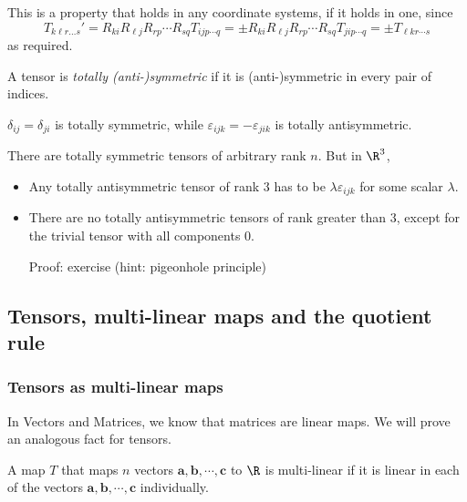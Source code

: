 \documentclass[a4paper]{article}
\begin{document}
This is a property that holds in any coordinate systems, if it holds in one, since
\[
  T_{k\ell r\ldots s}' = R_{ki}R_{\ell j}R_{rp}\cdots R_{sq}T_{ijp\cdots q} = \pm R_{ki} R_{\ell j} R_{rp}\cdots R_{sq}T_{jip\cdots q} = \pm T_{\ell kr\cdots s}
\]
as required.

\begin{defi}
  A tensor is \emph{totally (anti-)symmetric} if it is (anti-)symmetric in every pair of indices.
\end{defi}

\begin{eg}
  $\delta_{ij} = \delta_{ji}$ is totally symmetric, while $\varepsilon_{ijk} = -\varepsilon_{jik}$ is totally antisymmetric.

  There are totally symmetric tensors of arbitrary rank $n$. But in $\R^3$,
  \begin{itemize}
    \item Any totally antisymmetric tensor of rank 3 has to be $\lambda \varepsilon_{ijk}$ for some scalar $\lambda$.
    \item There are no totally antisymmetric tensors of rank greater than $3$, except for the trivial tensor with all components $0$.

      Proof: exercise (hint: pigeonhole principle)
  \end{itemize}
\end{eg}

\subsection{Tensors, multi-linear maps and the quotient rule}
\subsubsection{Tensors as multi-linear maps}
In Vectors and Matrices, we know that matrices are linear maps. We will prove an analogous fact for tensors.

\begin{defi}
  A map $T$ that maps $n$ vectors $\mathbf{a}, \mathbf{b}, \cdots, \mathbf{c}$ to $\R$ is multi-linear if it is linear in each of the vectors $\mathbf{a}, \mathbf{b}, \cdots, \mathbf{c}$ individually.
\end{defi}
\end{document}
